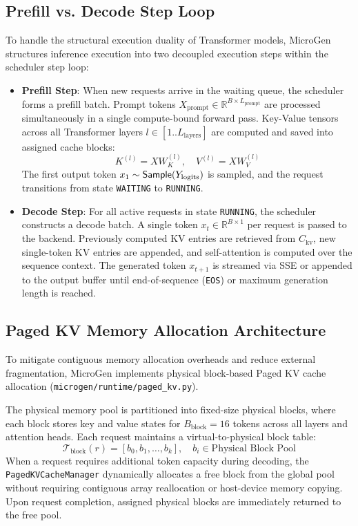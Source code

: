 \subsection{Prefill vs. Decode Step Loop}
\label{sec:prefill_decode_loop}

To handle the structural execution duality of Transformer models, \textsf{MicroGen} structures inference execution into two decoupled execution steps within the scheduler step loop:

\begin{itemize}
    \item \textbf{Prefill Step}: When new requests arrive in the waiting queue, the scheduler forms a prefill batch. Prompt tokens $X_{\text{prompt}} \in \mathbb{R}^{B \times L_{\text{prompt}}}$ are processed simultaneously in a single compute-bound forward pass. Key-Value tensors across all Transformer layers $l \in [1..L_{\text{layers}}]$ are computed and saved into assigned cache blocks:
    \begin{equation}
        K^{(l)} = X W_K^{(l)}, \quad V^{(l)} = X W_V^{(l)}
    \end{equation}
    The first output token $x_1 \sim \text{\textsf{Sample}}(Y_{\text{logits}})$ is sampled, and the request transitions from state \texttt{WAITING} to \texttt{RUNNING}.

    \item \textbf{Decode Step}: For all active requests in state \texttt{RUNNING}, the scheduler constructs a decode batch. A single token $x_t \in \mathbb{R}^{B \times 1}$ per request is passed to the backend. Previously computed KV entries are retrieved from $C_{\text{kv}}$, new single-token KV entries are appended, and self-attention is computed over the sequence context. The generated token $x_{t+1}$ is streamed via SSE or appended to the output buffer until end-of-sequence (\texttt{EOS}) or maximum generation length is reached.
\end{itemize}

\subsection{Paged KV Memory Allocation Architecture}
\label{sec:paged_kv_arch}

To mitigate contiguous memory allocation overheads and reduce external fragmentation, \textsf{MicroGen} implements physical block-based Paged KV cache allocation (\texttt{microgen/runtime/paged\_kv.py}). 

The physical memory pool is partitioned into fixed-size physical blocks, where each block stores key and value states for $B_{\text{block}} = 16$ tokens across all layers and attention heads. Each request maintains a virtual-to-physical block table:
\begin{equation}
    \mathcal{T}_{\text{block}}(r) = [b_0, b_1, \dots, b_k], \quad b_i \in \text{Physical Block Pool}
\end{equation}
When a request requires additional token capacity during decoding, the \texttt{PagedKVCacheManager} dynamically allocates a free block from the global pool without requiring contiguous array reallocation or host-device memory copying. Upon request completion, assigned physical blocks are immediately returned to the free pool.
